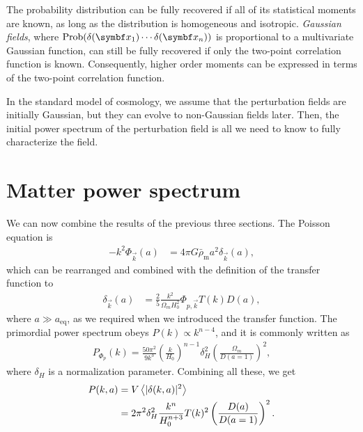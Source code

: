 The probability distribution can be fully recovered if all of its statistical moments are known, as long as the distribution is homogeneous and isotropic. \emph{Gaussian fields}, where $\Prob(\delta(\vec{x}_1) \cdots \delta(\vec{x}_n))$ is proportional to a multivariate Gaussian function, can still be fully recovered if only the two-point correlation function is known. Consequently, higher order moments can be expressed in terms of the two-point correlation function.

In the standard model of cosmology, we assume that the perturbation fields are initially Gaussian, but they can evolve to non-Gaussian fields later. Then, the initial power spectrum of the perturbation field is all we need to know to fully characterize the field.




\section{Matter power spectrum}
We can now combine the results of the previous three sections.
The Poisson equation is
\begin{align*}
	- k^2 \Phi_{\vec{k}}(a)
	&= 4 \pi G \bar{\rho}_\text{m} a^2 \delta_{\vec{k}}(a),
\end{align*}
which can be rearranged and combined with the definition of the transfer function to
\begin{align*}
	\delta_{\vec{k}}(a)
	&= \frac{2}{5} \frac{k^2}{\Omega_m H_0^2} \Phi_{p, \vec{k}} T(k) D(a),
\end{align*}
where $a \gg a_\text{eq}$, as we required when we introduced the transfer function.
The primordial power spectrum obeys $P(k) \propto k^{n-4}$, and it is commonly written as
\begin{align*}
	P_{\Phi_p}(k) = \frac{50 \pi^2}{9 k^3} 
	\left( \frac{k}{H_0} \right)^{n-1}
	\delta_{H}^2 
	\left( \frac{\Omega_m}{D(a=1)} \right)^2,
\end{align*}
where $\delta_H$ is a normalization parameter.
Combining all these, we get
\begin{align*}
	P(k,a)
	&= V \left\langle \vert\delta(k,a)\vert^2 \right\rangle\\
	&= 2 \pi^2 \delta_H^2 
	\frac{k^n}{H_0^{n+3}}
	T(k)^2
	\left( \frac{D(a)}{D(a=1)} \right)^2.
\end{align*}

